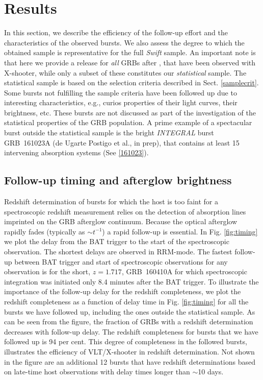 \documentclass[longauth]{aa}    %
\begin{document}
\section{Results} \label{results}

In this section, we describe the efficiency of the follow-up effort and the
characteristics of the observed bursts. We also assess the degree to which the
obtained sample is representative for the full \textit{Swift} sample. An
important note is that here we provide a release for \textit{all} GRBs after
\startdate, that have been observed with X-shooter, while only a subset of these
constitutes our \textit{statistical} sample. The statistical sample is based on
the selection criteria described in Sect. \ref{samplecrit}. Some bursts not
fulfilling the sample criteria have been followed up due to interesting
characteristics, e.g., curios properties of their light curves, their
brightness, etc. These bursts are not discussed as part of the investigation of
the statistical properties of the GRB population. A prime example of a
spectacular burst outside the statistical sample is the bright \textit{INTEGRAL}
burst GRB~161023A (de Ugarte Postigo et al., in prep), that contains at least 15
intervening absorption systems (See \ref{161023}).

\subsection{Follow-up timing and afterglow brightness} \label{timing}

Redshift determination of bursts for which the host is too faint for a
spectroscopic redshift measurement relies on the detection of absorption lines
imprinted on the GRB afterglow continuum. Because the optical afterglow rapidly
fades (typically as $\sim t^{-1}$) a rapid follow-up is essential. In Fig.
\ref{fig:timing} we plot the delay from the BAT trigger to the start of the
spectroscopic observation. The shortest delays are observed in RRM-mode. The
fastest follow-up between BAT trigger and start of spectroscopic observations
for any observation is for the short, $z = 1.717$, GRB~160410A for which
spectroscopic integration was initiated only 8.4 minutes after the BAT trigger.
To illustrate the importance of the follow-up delay for the redshift
completeness, we plot the redshift completeness as a function of delay time in
Fig. \ref{fig:timing} for all the bursts we have followed up, including the ones
outside the statistical sample. As can be seen from the figure, the fraction of
GRBs with a redshift determination decreases with follow-up delay. The redshift
completeness for bursts that we have followed up is 94 per cent. This degree of
completeness in the followed bursts, illustrates the efficiency of VLT/X-shooter
in redshift determination. Not shown in the figure are an additional 12 bursts
that have redshift determinations based on late-time host observations with
delay times longer than $\sim$10 days.
\end{document}
